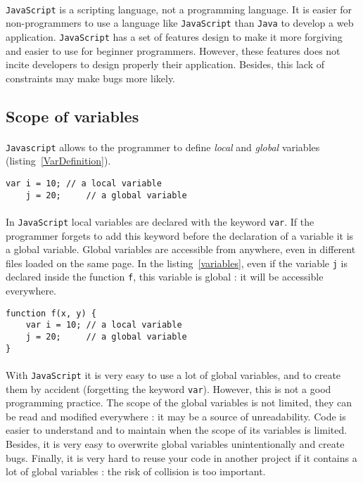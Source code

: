 \paragraph{} 
\texttt{JavaScript} is a scripting language, not a programming language. It is easier for non-programmers to use a language like \texttt{JavaScript} than \texttt{Java} to develop a web application. \texttt{JavaScript} has a set of features design to make it more forgiving and easier to use for beginner programmers. However, these features does not incite developers to design properly their application. Besides, this lack of constraints may make bugs more likely. 

\subsection{Scope of variables}

\paragraph{}
\texttt{Javascript} allows to the programmer to define \emph{local} and \emph{global} variables (listing~\ref{VarDefinition}).
\begin{lstlisting}[caption={Defining variables}, label={VarDefinition}]
    var i = 10; // a local variable
    j = 20;     // a global variable
\end{lstlisting}

\paragraph{}
In \texttt{JavaScript} local variables are declared with the keyword \texttt{var}. If the programmer forgets to add this keyword before the declaration of a variable it is a global variable. Global variables are accessible from anywhere, even in different files loaded on the same page. In the listing~\ref{variables}, even if the variable \texttt{j} is declared inside the function \texttt{f}, this variable is global : it will be accessible everywhere.  
\begin{lstlisting}[caption={Global and local variables}, label={variables}]
function f(x, y) {
    var i = 10; // a local variable
    j = 20;     // a global variable
}
\end{lstlisting}

\paragraph{}
With \texttt{JavaScript} it is very easy to use a lot of global variables, and to create them by accident (forgetting the keyword \texttt{var}). However, this is not a good programming practice. The scope of the global variables is not limited, they can be read and modified everywhere : it may be a source of unreadability. Code is easier to understand and to maintain when the scope of its variables is limited. Besides, it is very easy to overwrite global variables unintentionally and create bugs. Finally, it is very hard to reuse your code in another project if it contains a lot of global variables : the risk of collision is too important.

